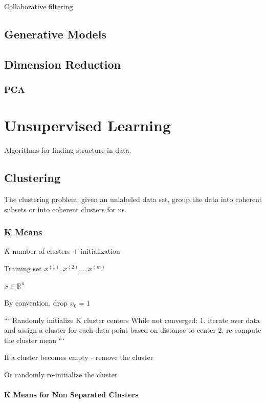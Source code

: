 {{Collaborative filtering

\section{Generative Models}

\section{Dimension Reduction}

\subsection{PCA}

\chapter{Unsupervised Learning}

Algorithms for finding structure in data.

\section{Clustering}

The clustering problem: given an unlabeled data set, group the data into coherent  subsets or into coherent clusters for us.

\subsection{K Means}

\item $K$ number of clusters + initialization
\item Training set ${x^{(1)},x^{(2)}\dots,x^{(m)}}$
\item $x\in\mathbb{R}^n$
\item By convention, drop $x_0=1$

```
Randomly initialize K cluster centers
While not converged:
1. iterate over data and assign a cluster for each data point based on distance to center
2. re-compute the cluster mean
```

If a cluster becomes empty - remove the cluster

Or randomly re-initialize the cluster

\subsubsection{K Means for Non Separated Clusters}

}}
